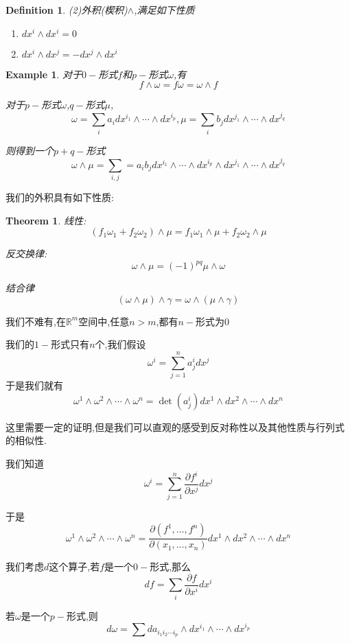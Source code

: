 \documentclass[11pt,hyperref,a4paper,UTF8]{ctexart}
\newtheorem{theorem}{Theorem}[subsection]
\newtheorem{example}{Example}[subsection]
\newtheorem{definition}{Definition}[subsection]
\newcommand{\RR}{\mathbb{R}}
\begin{document}
\begin{CJK}{UTF8}{gkai}
\begin{definition}
  (2)外积(楔积)$\wedge$,满足如下性质
  \begin{enumerate}
    \item $dx^{i} \wedge dx^{i} = 0$
    \item $dx^{i} \wedge dx^{j} = -dx^{j} \wedge dx^{i}$
  \end{enumerate}
\end{definition}

\begin{example}
  对于$0-$形式$f$和$p-$形式$\omega$,有
  \[f\wedge \omega = f\omega = \omega \wedge f\]

  对于$p-$形式$\omega$,$q-$形式$\mu$,
  \[\omega = \sum_{i} a_i dx^{i_1}\wedge \cdots \wedge dx^{i_p} , \mu = \sum_i b_j dx^{j_1}\wedge \cdots \wedge dx^{j_q} \]

  则得到一个$p + q-$形式
  \[\omega\wedge \mu = \sum_{i,j} = a_i b_j dx^{i_1}\wedge \cdots \wedge dx^{i_p}\wedge dx^{j_1}\wedge \cdots \wedge dx^{j_q}\]
\end{example}

我们的外积具有如下性质:
\begin{theorem}
  线性:
  \[(f_1\omega_1 + f_2 \omega_2) \wedge \mu = f_1\omega_1  \wedge \mu + f_2 \omega_2 \wedge \mu\]

  反交换律:
  \[\omega \wedge \mu = (-1)^{pq}\mu \wedge \omega\]

  结合律
  \[(\omega \wedge \mu)\wedge \gamma = \omega \wedge (\mu \wedge \gamma)\]
\end{theorem}
我们不难有,在$\RR^m$空间中,任意$n > m$,都有$n-$形式为$0$

我们的$1-$形式只有$n$个,我们假设
\[\omega^i = \sum_{j = 1}^{n} a_j^i dx^{j}\]
于是我们就有
\[\omega^1 \wedge \omega^2 \wedge \cdots \wedge \omega^n = \det(a_j^i) dx^1 \wedge dx^2 \wedge\cdots \wedge dx^n\]

这里需要一定的证明,但是我们可以直观的感受到反对称性以及其他性质与行列式的相似性.

我们知道
\[\omega^i = \sum_{j = 1}^{n} \frac{\partial f^i}{\partial x^j} dx^j\]

于是
\[\omega^1 \wedge \omega^2 \wedge \cdots \wedge \omega^n = \frac{\partial(f^1,\ldots,f^n)}{\partial(x_1,\ldots,x_n)} dx^1 \wedge dx^2 \wedge\cdots \wedge dx^n\]

我们考虑$d$这个算子,若$f$是一个$0-$形式,那么
\[df = \sum_{i} \frac{\partial f}{\partial x^i} d x^i\]

若$\omega$是一个$p-$形式,则
\[d\omega = \sum d a_{i_1 i_2\cdots i_p} \wedge dx^{i_1}\wedge \cdots\wedge dx^{i_p}\]


\end{CJK}
\end{document}
